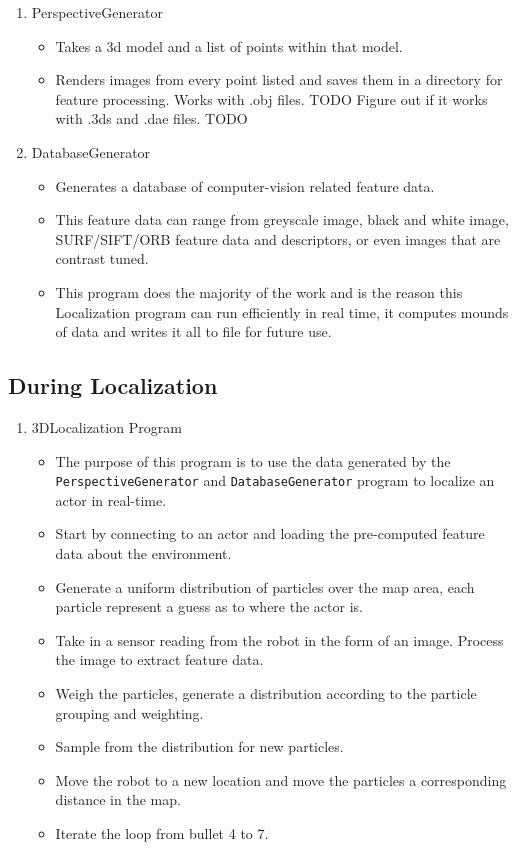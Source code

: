 \documentclass[a4paper,11pt]{article}
\begin{document}
        \begin{enumerate}
        \item PerspectiveGenerator
            \begin{itemize}
            \item Takes a 3d model and a list of points within that model.
            \item Renders images from every point listed and saves them in a directory for feature processing. Works with .obj files. TODO Figure out if it works with .3ds and .dae files. TODO
            \end{itemize}
        \item DatabaseGenerator
            \begin{itemize}
            \item Generates a database of computer-vision related feature data.
            \item This feature data can range from greyscale image, black and white image, SURF/SIFT/ORB feature data and descriptors, or even images that are contrast tuned.
            \item This program does the majority of the work and is the reason this Localization program can run efficiently in real time, it computes mounds of data and writes it all to file for future use.
            \end{itemize}
        \end{enumerate}
  
        \subsection{During Localization}
        \begin{enumerate}
        \item 3DLocalization Program
            \begin{itemize}
            \item The purpose of this program is to use the data generated by the \texttt{PerspectiveGenerator} and \texttt{DatabaseGenerator} program to localize an actor in real-time. 
            \item Start by connecting to an actor and loading the pre-computed feature data about the environment.
            \item Generate a uniform distribution of particles over the map area, each particle represent a guess as to where the actor is.
            \item Take in a sensor reading from the robot in the form of an image. Process the image to extract feature data.
            \item Weigh the particles, generate a distribution according to the particle grouping and weighting.
            \item Sample from the distribution for new particles.
            \item Move the robot to a new location and move the particles a corresponding distance in the map.
            \item Iterate the loop from bullet 4 to 7.
            \end{itemize}
        \end{enumerate}
        \newpage
\end{document}
